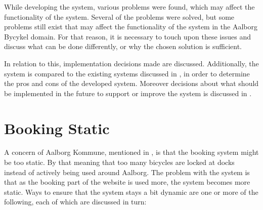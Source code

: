 While developing the system, various problems were found, which may affect the functionality of the system.
Several of the problems were solved, but some problems still exist that may affect the functionality of the system in the Aalborg Bycykel domain.
For that reason, it is necessary to touch upon these issues and discuss what can be done differently, or why the chosen solution is sufficient.

In relation to this, implementation decisions made are discussed.
Additionally, the system is compared to the existing systems discussed in , in order to determine the pros and cons of the developed system.
Moreover decisions about what should be implemented in the future to support or improve the system is discussed in .

\section*{Booking Static}
A concern of Aalborg Kommune, mentioned in , is that the booking system might be too static.
By that meaning that too many bicycles are locked at docks instead of actively being used around Aalborg.
The problem with the system is that as the booking part of the website is used more, the system becomes more static.
Ways to ensure that the system stays a bit dynamic are one or more of the following, each of which are discussed in turn:

